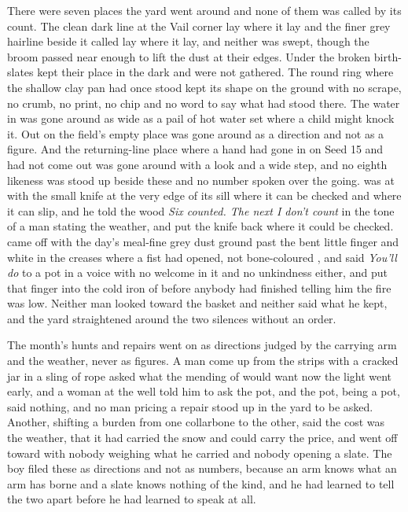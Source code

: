 There were seven places the yard went around and none of them was called by its count. The clean dark line at the Vail corner lay where it lay and the finer grey hairline beside it called  lay where it lay, and neither was swept, though the broom passed near enough to lift the dust at their edges. Under  the broken birth-slates kept their place in the dark and were not gathered. The round ring where the shallow clay pan had once stood kept its shape on the ground with no scrape, no crumb, no print, no chip and no word to say what had stood there. The water in  was gone around as wide as a pail of hot water set where a child might knock it. Out on  the field's empty place was gone around as a direction and not as a figure. And the returning-line place where a hand had gone in on Seed 15 and had not come out was gone around with a look and a wide step, and no eighth likeness was stood up beside these and no number spoken over the going.  was at  with the small knife at the very edge of its sill where it can be checked and where it can slip, and he told the wood \emph{Six counted. The next I don't count} in the tone of a man stating the weather, and put the knife back where it could be checked.  came off  with the day's meal-fine grey dust ground past the bent little finger and white in the creases where a fist had opened, not bone-coloured , and said \emph{You'll do} to a pot in a voice with no welcome in it and no unkindness either, and put that finger into the cold iron of  before anybody had finished telling him the fire was low. Neither man looked toward the basket and neither said what he kept, and the yard straightened around the two silences without an order.

The month's hunts and repairs went on as directions judged by the carrying arm and the weather, never as figures. A man come up from the strips with a cracked jar in a sling of rope asked what the mending of  would want now the light went early, and a woman at the well told him to ask the pot, and the pot, being a pot, said nothing, and no man pricing a repair stood up in the yard to be asked. Another, shifting a burden from one collarbone to the other, said the cost was the weather, that it had carried the snow and could carry the price, and went off toward  with nobody weighing what he carried and nobody opening a slate. The boy filed these as directions and not as numbers, because an arm knows what an arm has borne and a slate knows nothing of the kind, and he had learned to tell the two apart before he had learned to speak at all.

